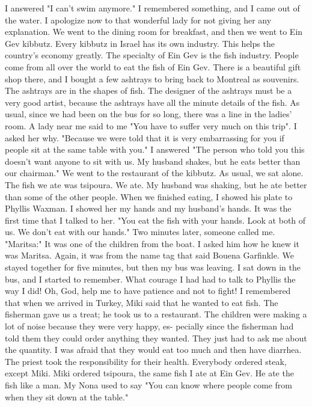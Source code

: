 I answered "I can't swim anymore."
I remembered something, and I came  out of the water.
I apologize now to that wonderful lady for not giving her any explanation.
We went to the dining room for breakfast, and then we went to Ein Gev 
kibbutz.
Every kibbutz in Israel has its own industry.
This helps the 
country's economy greatly.
The specialty of Ein Gev is the fish industry.
People come from all over the world to eat the fish of Ein Gev.
There is a beautiful gift shop there, and I bought a few ashtrays to bring 
back to Montreal as souvenirs.
The ashtrays are in the shapes of fish.
The designer of the ashtrays must be a very good artist, because the ashtrays 
have all the minute details of the fish.
As usual, since we had been on the bus for so long, there was a line in 
the ladies' room.
A lady near me said to me "You have to suffer very much 
on this trip".
I asked her why.
"Because we were told that it is very embarrassing for you if people sit at the same table with you."
I answered 
"The person who told you this doesn't want anyone to sit with us.
My husband shakes, but he eats better than our chairman."
We went to the restaurant of the kibbutz.
As usual, we sat alone.
The 
fish we ate was tsipoura.
We ate.
My husband was shaking, but he ate better than some of the other people.
When we finished eating, I showed 
his plate to Phyllis Waxman.
I showed her my hands and my husband's hands.
It was the first time that I talked to her.
"You eat the fish 
with your hands.
Look at both of us.
We don't eat with our hands."
Two minutes later, someone called me.
"Maritsa:" It was one of the children from the boat.
I asked him how he knew it was Maritsa.
Again, it was from the name tag that said Bouena Garfinkle.
We stayed together for five minutes, but then my bus was leaving.
I sat down in the bus, and I started to remember.
What courage I had had to talk to Phyllis the way I did!
Oh, God, help me to have patience and not to fight!
I remembered that when we arrived in Turkey, Miki said that he wanted 
to eat fish.
The fisherman gave us a treat; he took us to a restaurant.
The children were making a lot of noise because they were very happy, es-
pecially since the fisherman had told them they could order anything they 
wanted.
They just had to ask me about the quantity.
I was afraid that 
they would eat too much and then have diarrhea.
The priest took the responsibility for their health.
Everybody ordered steak, except Miki.
Miki ordered tsipoura, the same 
fish I ate at Ein Gev.
He ate the fish like a man.
My Nona used to say 
"You can know where people come from when they sit down at the table."
